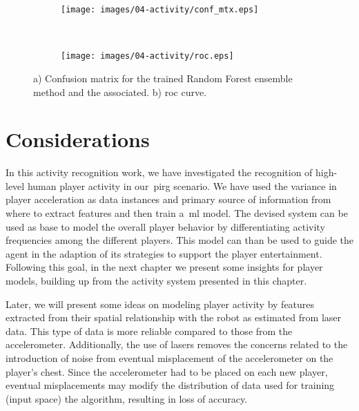 \begin{figure}[h]
    \centering
    \begin{subfigure}[h]{7cm}
       \centering
       \texttt{[image: images/04-activity/conf\_mtx.eps]}
       \caption{}
	\end{subfigure}
	~
    \begin{subfigure}[h]{7cm}
     	\centering
        \texttt{[image: images/04-activity/roc.eps]}
        \caption{}
	\end{subfigure}
	\caption{a) Confusion matrix for the trained Random Forest ensemble method and the associated. b) \gls{roc} curve.}\label{fig:mtx-roc}
\end{figure}

\section{Considerations}

In this activity recognition work, we have investigated the recognition of high-level human player activity in our~\gls{pirg} scenario. We have used the variance in player acceleration as data instances and primary source of information from where to extract features and then train a~\gls{ml} model. The devised system can be used as base to model the overall player behavior by differentiating activity frequencies among the different players. This model can than be used to guide the agent in the adaption of its strategies to support the player entertainment. Following this goal, in the next chapter we present some insights for player models, building up from the activity system presented in this chapter.

Later, we will present some ideas on modeling player activity by features extracted from their spatial relationship with the robot as estimated from laser data. %
This type of data is more reliable compared to those from the accelerometer. Additionally, the use of lasers removes the concerns related to the introduction of noise from eventual misplacement of the accelerometer on the player's chest. Since the accelerometer had to be placed on each new player, eventual misplacements may modify the distribution of data used for training (input space) the algorithm, resulting in loss of accuracy. 
